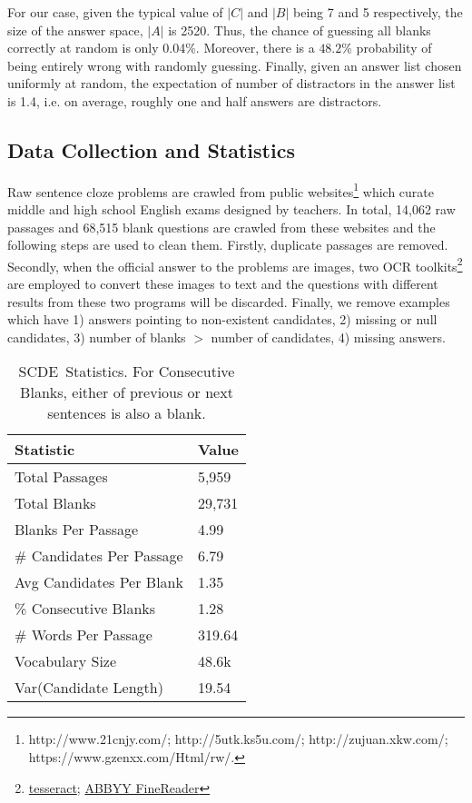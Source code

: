 \documentclass[11pt,a4paper]{article}
\newcommand{\dsname}{\textsc{SCDE}}
\begin{document}
For our case, given the typical value of $|C|$ and $|B|$ being 7 and 5 respectively, the size of the answer space, $|A|$ is 2520.
Thus, the chance of guessing all blanks correctly at random is only 0.04\%. Moreover, there is a $48.2$\% probability of being entirely wrong with randomly guessing. Finally, given an answer list chosen uniformly at random, the expectation of number of distractors in the answer list is 1.4, i.e. on average, roughly one and half answers are distractors.

\subsection{Data Collection and Statistics} \label{sec:dataCollection}
Raw sentence cloze problems are crawled from public websites\footnote{http://www.21cnjy.com/;
http://5utk.ks5u.com/; http://zujuan.xkw.com/;
https://www.gzenxx.com/Html/rw/.} which curate middle and high school English exams designed by teachers. In total, 14,062 raw passages and 68,515 blank questions are crawled from these websites and the following steps are used to clean them. Firstly, duplicate passages are removed. Secondly, when the official answer to the problems are images, two OCR toolkits\footnote{\href{https://github.com/tesseract-ocr}{tesseract}; \href{https://www.abbyy.com/en-us/finereader/}{ABBYY FineReader}
} are employed to convert these images to text and the questions with different results from these two programs will be discarded. Finally, we remove examples which have 1) answers pointing to non-existent candidates, 2) missing or null candidates, 3) number of blanks $>$ number of candidates, 4) missing answers.


\begin{table}
    \centering
    \begin{tabular}{l l}
    \toprule
    \textbf{Statistic} & \textbf{Value}    \\ \midrule
    Total Passages & 5,959   \\
    Total Blanks & 29,731 \\
    Blanks Per Passage  & 4.99     \\ 
    \# Candidates Per Passage & 6.79  \\
    Avg Candidates Per Blank  & 1.35      \\ 
    \% Consecutive Blanks & 1.28  \\
    \# Words Per Passage & 319.64  \\
    Vocabulary Size & 48.6k\\
    {\rm Var}(Candidate Length)& 19.54 \\
    \bottomrule
    \end{tabular}
    \caption{\dsname~Statistics. For Consecutive Blanks, either of previous or next sentences is also a blank.}
    \textbf{\label{table:stats}}
    \vspace{-4ex}
\end{table} 
\end{document}
